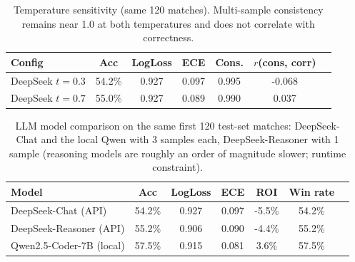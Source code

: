 \documentclass[10pt]{article}
\begin{document}
\begin{table}[H]
\centering
\caption{Temperature sensitivity (same 120 matches). Multi-sample consistency
remains near 1.0 at both temperatures and does not correlate with correctness.}
\label{tab:temp}
\begin{tabular}{lcccccc}
\toprule
Config & Acc & LogLoss & ECE & Cons. & $r$(cons, corr) \\
\midrule
DeepSeek $t=0.3$ & 54.2\% & 0.927 & 0.097 & 0.995 & -0.068 \\
DeepSeek $t=0.7$ & 55.0\% & 0.927 & 0.089 & 0.990 & 0.037 \\
\bottomrule
\end{tabular}
\end{table}

\begin{table}[H]
\centering
\caption{LLM model comparison on the same first 120 test-set matches:
DeepSeek-Chat and the local Qwen with 3 samples each, DeepSeek-Reasoner with 1
sample (reasoning models are roughly an order of magnitude slower; runtime
constraint).}
\label{tab:llmcmp}
\begin{tabular}{lcccccc}
\toprule
Model & Acc & LogLoss & ECE & ROI & Win rate \\
\midrule
DeepSeek-Chat (API) & 54.2\% & 0.927 & 0.097 & -5.5\% & 54.2\% \\
DeepSeek-Reasoner (API) & 55.2\% & 0.906 & 0.090 & -4.4\% & 55.2\% \\
Qwen2.5-Coder-7B (local) & 57.5\% & 0.915 & 0.081 & 3.6\% & 57.5\% \\
\bottomrule
\end{tabular}
\end{table}
\end{document}
